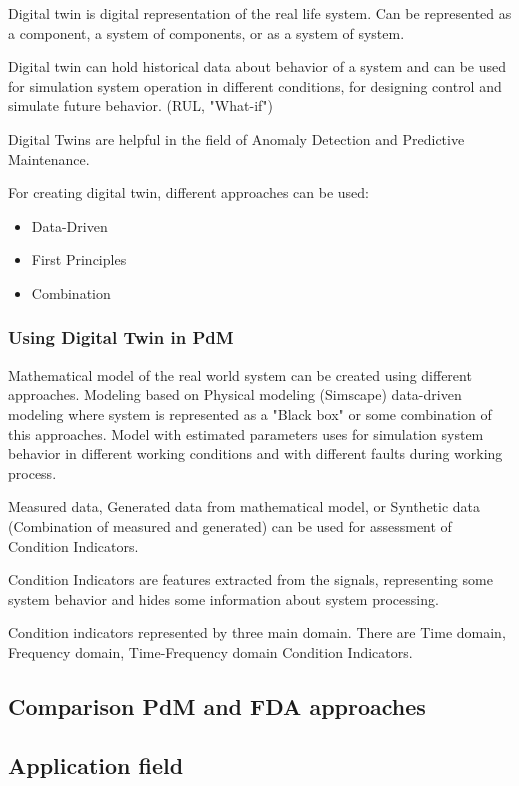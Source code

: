 \documentclass[class=article, crop=false]{standalone}
\begin{document}
Digital twin is digital representation of the real life system. Can be
represented as a component, a system of components, or as a system of
system.  

Digital twin can hold historical data about behavior of a system
and can be used for simulation system operation in different conditions,
for designing control and simulate future behavior. (RUL, "What-if")

Digital Twins are helpful in the field of Anomaly Detection and Predictive
Maintenance.

For creating digital twin, different approaches can be used:

\begin{itemize}
    \item Data-Driven
    \item First Principles
    \item Combination 
\end{itemize}


\subsubsection{Using Digital Twin in PdM}

Mathematical model of the real world system can be created using different
approaches. Modeling based on Physical modeling (Simscape) data-driven
modeling where system is represented as a "Black box" or some combination
of this approaches.
Model with estimated parameters uses for simulation system behavior in
different working conditions and with different faults during working
process.

Measured data, Generated data from mathematical model, or Synthetic data
(Combination of measured and generated) can be used for assessment of
Condition Indicators. 

Condition Indicators are features extracted from the signals, representing some
system behavior and hides some information about system processing.

Condition indicators represented by three main domain. There are Time
domain, Frequency domain, Time-Frequency domain Condition Indicators.



\subsection{Comparison PdM and FDA approaches}

\subsection{Application field}
\end{document}
